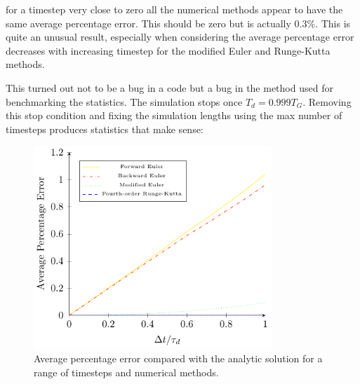 \documentclass[../Interim_Report_Master]{subfiles}
\begin{document}
for a timestep very close to zero all the numerical methods appear to have the same average percentage error. This should be zero but is actually $0.3\%$. This is quite an unusual result, especially when considering the average percentage error decreases with increasing timestep for the modified Euler and Runge-Kutta methods. 

This turned out not to be a bug in a code but a bug in the method used for benchmarking the statistics. The simulation stops once $T_d = 0.999T_G$. Removing this stop condition and fixing the simulation lengths using the max number of timesteps produces statistics that make sense:
\begin{figure}[h]
	\centering
	\includegraphics[width=0.8\textwidth]{./Diagrams/Uncoupled_Temp_Convergence_2/Uncoupled_Temp_Convergence_2.pdf}
	\caption{Average percentage error compared with the analytic solution for a range of timesteps and numerical methods.}
	\label{uc_temp_convergence_2}
\end{figure}
\end{document}
